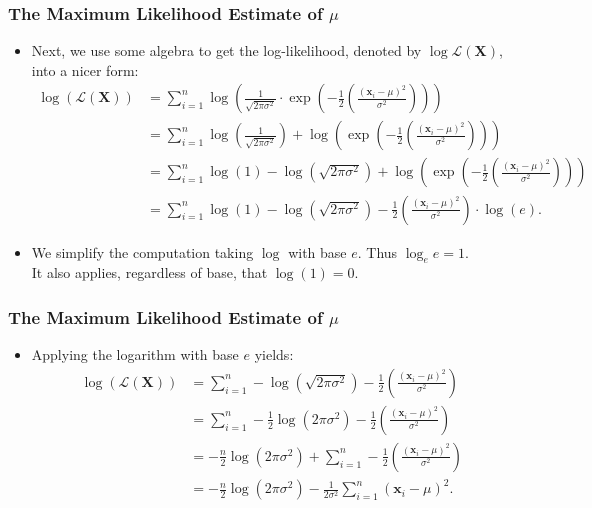 \begin{frame}
  \frametitle{The Maximum Likelihood Estimate of $\mu$}
  \begin{itemize}
  \item Next, we use some algebra to get the log-likelihood, denoted by $\log \mathcal{L}(\mathbf{X})$, into a nicer form:
    \begin{align}
      \log\left(\mathcal{L}(\mathbf{X})\right) &= \sum_{i=1}^{n} \log\left(\frac{1}{\sqrt{2\pi\sigma^2}} \cdot \exp\left( -\frac{1}{2} \left( \frac{(\mathbf{x}_i-\mu)^2}{\sigma^2} \right)\right)\right) \\
                                               &= \sum_{i=1}^{n} \log\left(\frac{1}{\sqrt{2\pi\sigma^2}}\right) + \log\left(\exp\left( -\frac{1}{2} \left( \frac{(\mathbf{x}_i-\mu)^2}{\sigma^2} \right)\right)\right)\\
                                               &= \sum_{i=1}^{n} \log(1) - \log(\sqrt{2\pi\sigma^2}) + \log\left(\exp\left( -\frac{1}{2} \left( \frac{(\mathbf{x}_i-\mu)^2}{\sigma^2} \right)\right)\right)\\
                                               &= \sum_{i=1}^{n} \log(1) - \log\left(\sqrt{2\pi\sigma^2}\right) - \frac{1}{2} \left( \frac{(\mathbf{x}_i-\mu)^2}{\sigma^2} \right) \cdot \log(e).
    \end{align}
  \item We simplify the computation taking $\log$ with base $e$. Thus $\log_e e = 1$. \\
    It also applies, regardless of base, that $\log(1) = 0$.
  \end{itemize}
\end{frame}


\begin{frame}
  \frametitle{The Maximum Likelihood Estimate of $\mu$}
  \begin{itemize}
  \item Applying the logarithm with base $e$ yields:
    \begin{align}
      \log\left(\mathcal{L}(\mathbf{X})\right) &= \sum_{i=1}^{n} - \log\left(\sqrt{2\pi\sigma^2}\right) -\frac{1}{2} \left( \frac{(\mathbf{x}_i-\mu)^2}{\sigma^2} \right)\\
                                               &= \sum_{i=1}^{n} - \frac{1}{2} \log\left(2\pi\sigma^2\right) -\frac{1}{2} \left( \frac{(\mathbf{x}_i-\mu)^2}{\sigma^2} \right) \\
                                               &= - \frac{n}{2} \log\left(2\pi\sigma^2\right) + \sum_{i=1}^{n} -\frac{1}{2} \left( \frac{(\mathbf{x}_i-\mu)^2}{\sigma^2} \right)\\
                                               &= - \frac{n}{2} \log\left(2\pi\sigma^2\right) - \frac{1}{2\sigma^2} \sum_{i=1}^{n} (\mathbf{x}_i-\mu)^2.
    \end{align}
  \end{itemize}
\end{frame}


